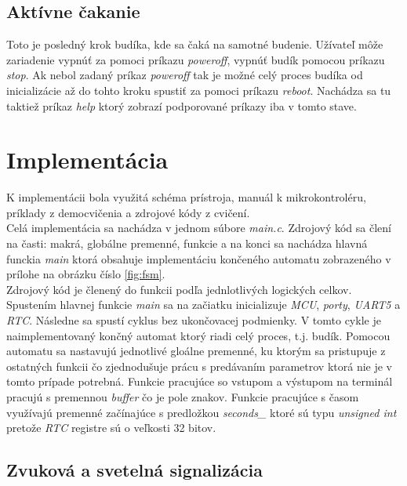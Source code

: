 \documentclass[11pt,a4paper]{article}
\begin{document}
        \subsection{Aktívne čakanie}

            \indent Toto je posledný krok budíka, kde sa čaká na samotné budenie. Užívateľ môže zariadenie vypnúť za pomoci príkazu \textit{poweroff}, vypnúť budík pomocou príkazu \textit{stop}. Ak nebol zadaný príkaz \textit{poweroff} tak je možné celý proces budíka od inicializácie až do tohto kroku spustiť za pomoci príkazu \textit{reboot}. Nachádza sa tu taktiež príkaz \textit{help} ktorý zobrazí podporované príkazy iba v tomto stave.


\section{Implementácia}

    \indent K implementácii bola využitá schéma prístroja\cite{SCHEME}, manuál k mikrokontroléru\cite{MANUAL}, príklady z democvičenia a zdrojové kódy z cvičení.\\

    \indent Celá implementácia sa nachádza v jednom súbore \textit{main.c}. Zdrojový kód sa člení na časti: makrá, globálne premenné, funkcie a na konci sa nachádza hlavná funckia \textit{main} ktorá obsahuje implementáciu končeného automatu zobrazeného v prílohe na obrázku číslo \ref{fig:fsm}.\\

    \indent Zdrojový kód je členený do funkcii podľa jednlotlivých logických celkov. Spustením hlavnej funkcie \textit{main} sa na začiatku inicializuje \textit{MCU}, \textit{porty}, \textit{UART5} a \textit{RTC}. Následne sa spustí cyklus bez ukončovacej podmienky. V tomto cykle je naimplementovaný končný automat ktorý riadi celý proces, t.j. budík. Pomocou automatu sa nastavujú jednotlivé gloálne premenné, ku ktorým sa pristupuje z ostatných funkcii čo zjednodušuje prácu s predávaním parametrov ktorá nie je v tomto prípade potrebná. Funkcie pracujúce so vstupom a výstupom na terminál pracujú s premennou \textit{buffer} čo je pole znakov. Funkcie pracujúce s časom využívajú premenné začínajúce s predložkou \textit{seconds\_} ktoré sú typu \textit{unsigned int} pretože \textit{RTC} registre sú o veľkosti 32 bitov.

    \subsection{Zvuková a svetelná signalizácia}
\end{document}
